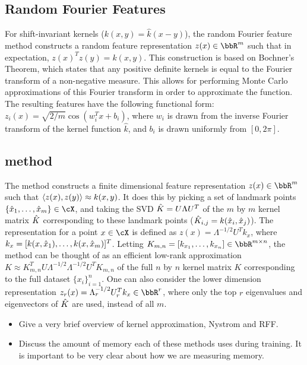 \subsection{Random Fourier Features}
For shift-invariant kernels ($k(x,y) = \hat{k}(x-y)$), 
the random Fourier feature method constructs a 
random feature representation $z(x) \in \RR^m$ such that in expectation, $z(x)^T z(y) = k(x,y)$.
This construction is based on Bochner's Theorem, which states that any positive 
definite kernels is equal to the Fourier transform of a non-negative measure.
This allows for performing Monte Carlo approximations of this Fourier transform
in order to approximate the function.  The resulting features have the following
functional form: $z_i(x) = \sqrt{2/m}\cos(w_i^Tx + b_i)$, where
$w_i$ is drawn from the inverse Fourier transform of the kernel function $\hat{k}$,
and $b_i$ is drawn uniformly from $[0,2\pi]$. 

\subsection{\Nystrom method}
The \Nystrom method constructs a finite dimensional feature representation
$z(x) \in \RR^m$ such that $\left\langle z(x),z(y)\right\rangle \approx k(x,y)$.  It does this
by picking a set of landmark points $\{\hx_1,\ldots,\hx_m\} \in \cX$,
and taking the SVD $\hat{K} = U\Lambda U^T$ of the $m$ by $m$ 
kernel matrix $\hat{K}$ corresponding to these landmark points 
($\hat{K}_{i,j} = k(\hat{x}_i,\hat{x}_j)$).  The \Nystrom representation for a point $x \in \cX$
is defined as $z(x) = \Lambda^{-1/2} U^T k_x$, where $k_x = [k(x,\hat{x}_1),\ldots,k(x,\hat{x}_m)]^T$.
Letting $K_{m,n} = [k_{x_1},\ldots,k_{x_n}] \in \RR^{m\times n}$, 
the \Nystrom method can be thought of as an efficient low-rank approximation
$K \approx K_{m,n}^T U \Lambda^{-1/2}\Lambda^{-1/2} U^T K_{m,n}$ of the full
$n$ by $n$ kernel matrix $K$ corresponding to the full dataset $\{x_i\}_{i=1}^n$.
One can also consider the lower dimension \Nystrom representation
$z_r(x) = \Lambda_r^{-1/2} U_r^T k_x \in \RR^r$, where only the top $r$ eigenvalues and
eigenvectors of $\hat{K}$ are used, instead of all $m$.








\begin{itemize}
	\item Give a very brief overview of kernel approximation, Nystrom and RFF.
	\item Discuss the amount of memory each of these methods uses during training.  It is important to be very clear about how we are measuring memory.
\end{itemize}

